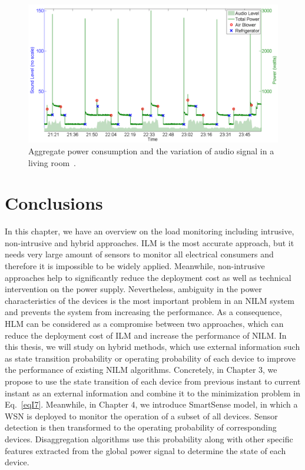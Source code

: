 \begin{figure}[!ht]
\centering
\includegraphics[width=1\textwidth]{./chapters/chapter2/images/audiochange.pdf} 
\caption{Aggregate power consumption and the variation of audio signal in a living room~\cite{Berges10}.} 
\label{fig:AA13} 
\end{figure}



\section{Conclusions}
In this chapter, we have an overview on the load monitoring including intrusive, non-intrusive and hybrid approaches. ILM is the most accurate approach, but it needs very large amount of sensors to monitor all electrical consumers and therefore it is impossible to be widely applied. Meanwhile, non-intrusive approaches help to significantly reduce the deployment cost as well as technical intervention on the power supply. Nevertheless, ambiguity in the power characteristics of the devices is the most important problem in an NILM system and prevents the system from increasing the performance. As a consequence, HLM can be considered as a compromise between two approaches, which can reduce the deployment cost of ILM and increase the performance of NILM. In this thesis, we will study on hybrid methods, which use external information such as state transition probability or operating probability of each device to improve the performance of existing NILM algorithms. Concretely, in Chapter 3, we propose to use the state transition of each device from previous instant to current instant as an external information and combine it to the minimization problem in Eq.~\eqref{eqI7}. Meanwhile, in Chapter 4, we introduce SmartSense model, in which a WSN is deployed to monitor the operation of a subset of all devices. Sensor detection is then transformed to the operating probability of corresponding devices. Disaggregation algorithms use this probability along with other specific features extracted from the global power signal to determine the state of each device.























